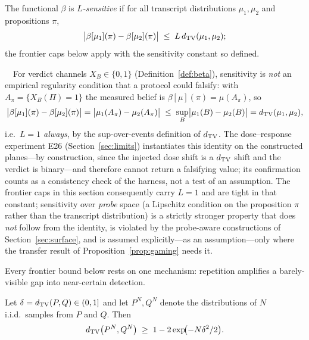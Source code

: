 \begin{definition}[Sensitivity]\label{def:sens}
The functional $\beta$ is \emph{$L$-sensitive} if for all transcript
distributions $\mu_1,\mu_2$ and propositions $\pi$,
\[
\bigl|\beta[\mu_1](\pi)-\beta[\mu_2](\pi)\bigr|
\;\le\;L\,d_{\mathrm{TV}}(\mu_1,\mu_2);
\]
the frontier caps below apply with the sensitivity constant so defined.
\end{definition}

\begin{remark}\label{rem:sens}\ \
For verdict channels $X_B\in\{0,1\}$ (Definition~\ref{def:beta}), sensitivity
is \emph{not} an empirical regularity condition that a protocol could
falsify: with $A_\pi=\{X_B(\Pi)=1\}$ the measured belief is
$\beta[\mu](\pi)=\mu(A_\pi)$, so
\[
\bigl|\beta[\mu_1](\pi)-\beta[\mu_2](\pi)\bigr|
=\bigl|\mu_1(A_\pi)-\mu_2(A_\pi)\bigr|
\;\le\;\sup_B\bigl|\mu_1(B)-\mu_2(B)\bigr|
=d_{\mathrm{TV}}(\mu_1,\mu_2),
\]
i.e.\ \emph{$L=1$ always}, by the sup-over-events definition of $d_{\mathrm{TV}}$.
The dose--response experiment E26 (Section~\ref{sec:limits}) instantiates
this identity on the constructed planes---by construction, since the
injected dose shift is a $d_{\mathrm{TV}}$ shift and the verdict is binary---and
therefore cannot return a falsifying value; its confirmation counts as a
consistency check of the harness, not a test of an assumption. The frontier
caps in this section consequently carry $L=1$ and are tight in that
constant; sensitivity over \emph{probe} space (a Lipschitz condition on the
proposition $\pi$ rather than the transcript distribution) is a strictly
stronger property that does \emph{not} follow from the identity, is
violated by the probe-aware constructions of
Section~\ref{sec:surface}, and is assumed explicitly---as an
assumption---only where the transfer result of
Proposition~\ref{prop:gaming} needs it.
\end{remark}

Every frontier bound below rests on one mechanism: repetition amplifies a
barely-visible gap into near-certain detection.

\begin{lemma}[Amplification]\label{lem:amp}
Let $\delta=d_{\mathrm{TV}}(P,Q)\in(0,1]$ and let $P^N,Q^N$ denote the distributions of
$N$ i.i.d.\ samples from $P$ and $Q$. Then
\[
d_{\mathrm{TV}}\bigl(P^{N},Q^{N}\bigr)\;\ge\;1-2\exp\!\bigl(-N\delta^{2}/2\bigr).
\]
\end{lemma}

